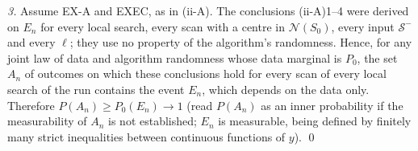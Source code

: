 \documentclass[11pt]{article}
\theoremstyle{remark}
\newcommand{\cS}{\mathcal{S}}
\newcommand{\cN}{\mathcal{N}}
\begin{document}
\emph{3.} Assume EX-A and EXEC, as in (ii-A). The conclusions (ii-A)1--4 were derived on $E_n$ for every local search, every scan with a centre in $\cN(S_0)$, every input $\cS^-$ and every $\ell$; they use no property of the algorithm's randomness. Hence, for any joint law of data and algorithm randomness whose data marginal is $P_0$, the set $A_n$ of outcomes on which these conclusions hold for every scan of every local search of the run contains the event $E_n$, which depends on the data only. Therefore $P(A_n)\ge P_0(E_n)\to1$ (read $P(A_n)$ as an inner probability if the measurability of $A_n$ is not established; $E_n$ is measurable, being defined by finitely many strict inequalities between continuous functions of $y$). \qed
\end{document}
